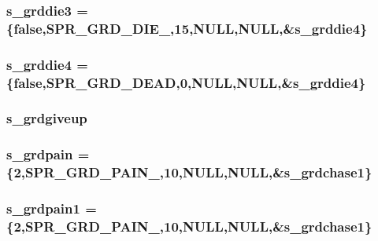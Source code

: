 \label{WL__ACT2_8C_a35c17f538a7e09ae3511a12e8b401e1f}
\hypertarget{WL__ACT2_8C_ab2a57ab74eb1827e7b329072e54a7c19}{
\subsubsection[{s\_\-grddie3}]{ {\bf s\_\-grddie3} = \{false,SPR\_\-GRD\_\-DIE\_,15,NULL,NULL,\&{\bf s\_\-grddie4}\}}}
\label{WL__ACT2_8C_ab2a57ab74eb1827e7b329072e54a7c19}
\hypertarget{WL__ACT2_8C_a08860dbac097905f27be5682153d8de4}{
\subsubsection[{s\_\-grddie4}]{ {\bf s\_\-grddie4} = \{false,SPR\_\-GRD\_\-DEAD,0,NULL,NULL,\&{\bf s\_\-grddie4}\}}}
\label{WL__ACT2_8C_a08860dbac097905f27be5682153d8de4}
\hypertarget{WL__ACT2_8C_a2de60c43c99fad09ca06d66604c5dc9d}{
\subsubsection[{s\_\-grdgiveup}]{ {\bf s\_\-grdgiveup}}}
\label{WL__ACT2_8C_a2de60c43c99fad09ca06d66604c5dc9d}
\hypertarget{WL__ACT2_8C_a97e65436bab06912e56ddec59ee73a3e}{
\subsubsection[{s\_\-grdpain}]{ {\bf s\_\-grdpain} = \{2,SPR\_\-GRD\_\-PAIN\_,10,NULL,NULL,\&{\bf s\_\-grdchase1}\}}}
\label{WL__ACT2_8C_a97e65436bab06912e56ddec59ee73a3e}
\hypertarget{WL__ACT2_8C_a8e29ce2b8a415ba47460c294eda3b480}{
\subsubsection[{s\_\-grdpain1}]{ {\bf s\_\-grdpain1} = \{2,SPR\_\-GRD\_\-PAIN\_,10,NULL,NULL,\&{\bf s\_\-grdchase1}\}}}
